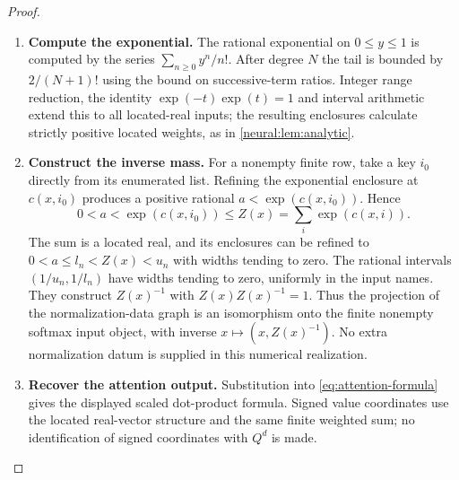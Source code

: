 \documentclass[11pt,a4paper]{article}
\theoremstyle{definition}
\theoremstyle{remark}\newaliascnt{remark}{theorem}
\numberwithin{equation}{section}
\begin{document}
\begin{proof}\leavevmode
\begin{enumerate}[titledsteps]
    \item \textbf{Compute the exponential.} The rational exponential on $0\le y\le1$ is computed by the series $\sum_{n\ge0}y^n/n!$. After degree $N$ the tail is bounded by $2/(N+1)!$ using the bound on successive-term ratios. Integer range reduction, the identity $\exp(-t)\exp(t)=1$ and interval arithmetic extend this to all located-real inputs; the resulting enclosures calculate strictly positive located weights, as in \cref{neural:lem:analytic}.


    \item \textbf{Construct the inverse mass.} For a nonempty finite row, take a key $i_0$ directly from its enumerated list. Refining the exponential enclosure at $c(x,i_0)$ produces a positive rational $a<\exp(c(x,i_0))$. Hence
\[
 0<a<\exp(c(x,i_0))\le Z(x)=\sum_i\exp(c(x,i)).
\]
The sum is a located real, and its enclosures can be refined to $0<a\le l_n<Z(x)<u_n$ with widths tending to zero. The rational intervals $(1/u_n,1/l_n)$ have widths tending to zero, uniformly in the input names. They construct $Z(x)^{-1}$ with $Z(x)Z(x)^{-1}=1$. Thus the projection of the normalization-data graph is an isomorphism onto the finite nonempty softmax input object, with inverse $x\mapsto(x,Z(x)^{-1})$. No extra normalization datum is supplied in this numerical realization.


    \item \textbf{Recover the attention output.} Substitution into \eqref{eq:attention-formula} gives the displayed scaled dot-product formula. Signed value coordinates use the located real-vector structure and the same finite weighted sum; no identification of signed coordinates with $Q^d$ is made.\qedhere
\end{enumerate}
\end{proof}
\end{document}
